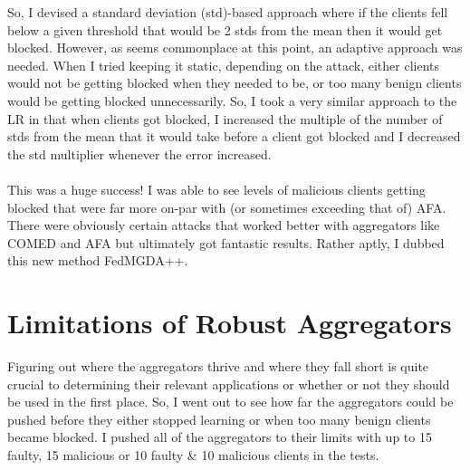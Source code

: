 So, I devised a standard deviation (std)-based approach where if the clients fell below a given threshold that would be 2 stds from the mean then it would get blocked.
However, as seems commonplace at this point, an adaptive approach was needed.
When I tried keeping it static, depending on the attack, either clients would not be getting blocked when they needed to be, or too many benign clients would be getting blocked unnecessarily. 
So, I took a very similar approach to the LR in that when clients got blocked, I increased the multiple of the number of stds from the mean that it would take before a client got blocked and I decreased the std multiplier whenever the error increased.
\\ \\
This was a huge success!
I was able to see levels of malicious clients getting blocked that were far more on-par with (or sometimes exceeding that of) AFA.
There were obviously certain attacks that worked better with aggregators like COMED and AFA but ultimately got fantastic results.
Rather aptly, I dubbed this new method FedMGDA++.

\section{Limitations of Robust Aggregators}
Figuring out where the aggregators thrive and where they fall short is quite crucial to determining their relevant applications or whether or not they should be used in the first place.
So, I went out to see how far the aggregators could be pushed before they either stopped learning or when too many benign clients became blocked.
I pushed all of the aggregators to their limits with up to 15 faulty, 15 malicious or 10 faulty \& 10 malicious clients in the tests.


